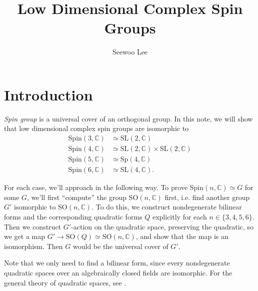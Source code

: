 \documentclass{article}
\title{Low Dimensional Complex Spin Groups}
\author{Seewoo Lee}
\newcommand{\bC}{\mathbb{C}}
\newcommand{\SO}{\mathrm{SO}}
\newcommand{\SL}{\mathrm{SL}}
\newcommand{\Spin}{\mathrm{Spin}}
\newcommand{\Sp}{\mathrm{Sp}}
\begin{document}
\maketitle

\section{Introduction}
\emph{Spin group} is a universal cover of an orthogonal group. In this note, we will show that low dimensional complex spin groups are isomorphic to 
\begin{align*}
    \Spin(3, \bC) &\simeq \SL(2, \bC) \\
    \Spin(4, \bC) &\simeq \SL(2, \bC) \times \SL(2, \bC) \\
    \Spin(5, \bC) &\simeq \Sp(4, \bC) \\
    \Spin(6, \bC) &\simeq \SL(4, \bC).
\end{align*}

For each case, we'll approach in the following way.
To prove $\Spin(n, \bC) \simeq G$ for some $G$, we'll first ``compute'' the group $\SO(n, \bC)$ first, i.e. find another group $G'$ isomorphic to $\SO(n, \bC)$.
To do this, we construct nondegenerate bilinear forms and the corresponding quadratic forms $Q$ explicitly for each $n \in \{3, 4, 5, 6\}$.
Then we construct $G'$-action on the quadratic space, preserving the quadratic, so we get a map $G' \to \SO(Q) \simeq \SO(n, \bC)$, and show that the map is an isomorphism.
Then $G$ would be the universal cover of $G'$.

Note that we only need to find a bilinear form, since every nondegenerate quadratic spaces over an algebraically closed fields are isomorphic.
For the general theory of quadratic spaces, see \cite{lam}.
\end{document}
